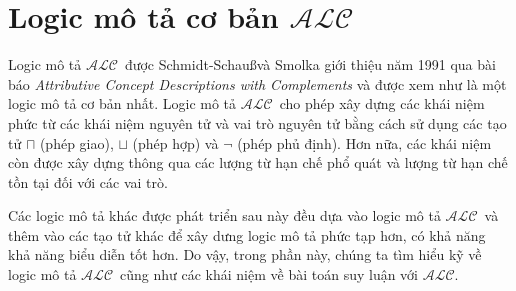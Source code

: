 \documentclass[12pt,a4paper]{report}
\newcommand{\mand}{\sqcap}
\newcommand{\mor}{\sqcup}
\newcommand{\ALC}{$\mathcal{ALC}$}
\begin{document}
\section{Logic mô tả cơ bản \ALC}\label{sec:LogicALC}
Logic mô tả \ALC\ được Schmidt-Schau\ss và Smolka giới thiệu năm 1991 qua bài báo \textit{Attributive Concept Descriptions with Complements} và được xem như là một logic mô tả cơ bản nhất. Logic mô tả \ALC\ cho phép xây dựng các khái niệm phức từ các khái niệm nguyên tử và vai trò nguyên tử bằng cách sử dụng các tạo tử $\mand$ (phép giao), $\mor$ (phép hợp) và $\neg$ (phép phủ định). Hơn nữa, các khái niệm còn được xây dựng thông qua các lượng từ hạn chế phổ quát và lượng từ hạn chế tồn tại đối với các vai trò.

Các logic mô tả khác được phát triển sau này đều dựa vào logic mô tả \ALC\ và thêm vào các tạo tử khác để xây dưng logic mô tả phức tạp hơn, có khả năng khả năng biểu diễn tốt hơn. Do vậy, trong phần này, chúng ta tìm hiểu kỹ về logic mô tả \ALC\ cũng như các khái niệm về bài toán suy luận với \ALC.
\end{document}
